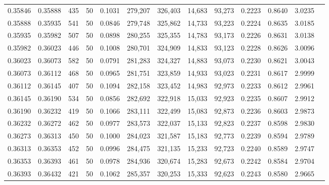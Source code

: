 \begin{tabular}{rrrrrrrrrrrrr}
0.35846 & 0.35888 &   435 &  50 &                                     0.1031 & 279,207 & 326,403 &  14,683 &  93,273 & 0.2223 & 0.8640 & 3.0235 \\
0.35888 & 0.35935 &   541 &  50 &                                     0.0846 & 279,748 & 325,862 &  14,733 &  93,223 & 0.2224 & 0.8635 & 3.0185 \\
0.35935 & 0.35982 &   507 &  50 &                                     0.0898 & 280,255 & 325,355 &  14,783 &  93,173 & 0.2226 & 0.8631 & 3.0138 \\
0.35982 & 0.36023 &   446 &  50 &                                     0.1008 & 280,701 & 324,909 &  14,833 &  93,123 & 0.2228 & 0.8626 & 3.0096 \\
0.36023 & 0.36073 &   582 &  50 &                                     0.0791 & 281,283 & 324,327 &  14,883 &  93,073 & 0.2230 & 0.8621 & 3.0043 \\
0.36073 & 0.36112 &   468 &  50 &                                     0.0965 & 281,751 & 323,859 &  14,933 &  93,023 & 0.2231 & 0.8617 & 2.9999 \\
0.36112 & 0.36145 &   407 &  50 &                                     0.1094 & 282,158 & 323,452 &  14,983 &  92,973 & 0.2233 & 0.8612 & 2.9961 \\
0.36145 & 0.36190 &   534 &  50 &                                     0.0856 & 282,692 & 322,918 &  15,033 &  92,923 & 0.2235 & 0.8607 & 2.9912 \\
0.36190 & 0.36232 &   419 &  50 &                                     0.1066 & 283,111 & 322,499 &  15,083 &  92,873 & 0.2236 & 0.8603 & 2.9873 \\
0.36232 & 0.36272 &   462 &  50 &                                     0.0977 & 283,573 & 322,037 &  15,133 &  92,823 & 0.2237 & 0.8598 & 2.9830 \\
0.36273 & 0.36313 &   450 &  50 &                                     0.1000 & 284,023 & 321,587 &  15,183 &  92,773 & 0.2239 & 0.8594 & 2.9789 \\
0.36313 & 0.36353 &   452 &  50 &                                     0.0996 & 284,475 & 321,135 &  15,233 &  92,723 & 0.2240 & 0.8589 & 2.9747 \\
0.36353 & 0.36393 &   461 &  50 &                                     0.0978 & 284,936 & 320,674 &  15,283 &  92,673 & 0.2242 & 0.8584 & 2.9704 \\
0.36393 & 0.36432 &   421 &  50 &                                     0.1062 & 285,357 & 320,253 &  15,333 &  92,623 & 0.2243 & 0.8580 & 2.9665 \\

\end{tabular}
